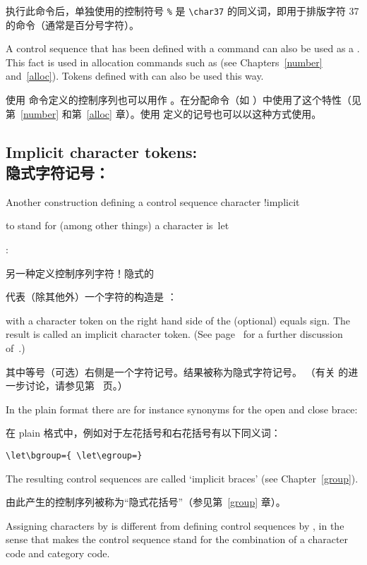 执行此命令后，单独使用的控制符号 \verb>%> 是 \verb>\char37> 的同义词，即用于排版字符 37 的命令（通常是百分号字符）。

A control sequence that has been defined with a 
command can also be used as a .
This fact is used in  allocation commands such as 
 (see Chapters~\ref{number} and~\ref{alloc}).
Tokens defined with  can also be used this
way.

使用  命令定义的控制序列也可以用作 。在分配命令（如 ）中使用了这个特性（见第~\ref{number} 和第~\ref{alloc} 章）。使用  定义的记号也可以以这种方式使用。


\subsection{Implicit character tokens: \protect{}\\隐式字符记号：\protect{}}

Another construction defining a control sequence
\term character !implicit\par
to stand for (among other things)
a character is~\cstoidx let\par:

另一种定义控制序列\term 字符！隐式的\par 代表（除其他外）一个字符的构造是 ：
\begin{disp}\end{disp}
with a character token on the right hand side of the (optional)
equals sign. The result is called an implicit character token.
(See page~\pageref{let} for a further discussion of~.)

其中等号（可选）右侧是一个字符记号。结果被称为隐式字符记号。
（有关  的进一步讨论，请参见第~\pageref{let} 页。）

In the
plain format there are for instance synonyms for
the open and close brace:

在 plain 格式中，例如对于左花括号和右花括号有以下同义词：
\begin{verbatim}
\let\bgroup={ \let\egroup=}
\end{verbatim}
The resulting control sequences are called `implicit braces'
(see Chapter~\ref{group}).

由此产生的控制序列被称为“隐式花括号”（参见第~\ref{group} 章）。

Assigning characters by 
is different from defining control sequences by , 
in the sense that 
makes the control sequence stand for the combination
of a character code and category code. 

